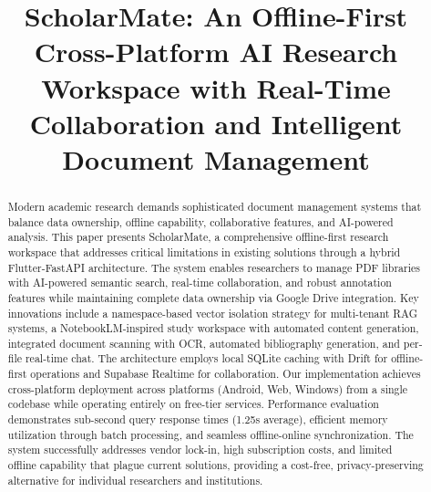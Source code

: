 \documentclass[conference]{IEEEtran}
\begin{document}
\title{ScholarMate: An Offline-First Cross-Platform AI Research Workspace with Real-Time Collaboration and Intelligent Document Management}

\author{
}

\maketitle

\begin{abstract}
Modern academic research demands sophisticated document management systems that balance data ownership, offline capability, collaborative features, and AI-powered analysis. This paper presents ScholarMate, a comprehensive offline-first research workspace that addresses critical limitations in existing solutions through a hybrid Flutter-FastAPI architecture. The system enables researchers to manage PDF libraries with AI-powered semantic search, real-time collaboration, and robust annotation features while maintaining complete data ownership via Google Drive integration. Key innovations include a namespace-based vector isolation strategy for multi-tenant RAG systems, a NotebookLM-inspired study workspace with automated content generation, integrated document scanning with OCR, automated bibliography generation, and per-file real-time chat. The architecture employs local SQLite caching with Drift for offline-first operations and Supabase Realtime for collaboration. Our implementation achieves cross-platform deployment across platforms (Android, Web, Windows) from a single codebase while operating entirely on free-tier services. Performance evaluation demonstrates sub-second query response times (1.25s average), efficient memory utilization through batch processing, and seamless offline-online synchronization. The system successfully addresses vendor lock-in, high subscription costs, and limited offline capability that plague current solutions, providing a cost-free, privacy-preserving alternative for individual researchers and institutions.
\end{abstract}
\end{document}
